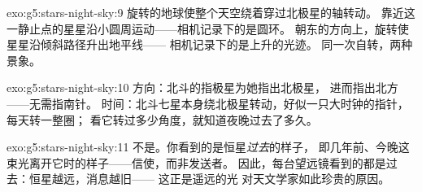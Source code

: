 \begin{solution}{exo:g5:stars-night-sky:9}
旋转的地球使整个天空绕着穿过北极星的轴转动。
靠近这一静止点的星星沿小圆周运动——相机记录下的是圆环。
朝东的方向上，旋转使星星沿倾斜路径升出地平线——
相机记录下的是上升的光迹。
同一次自转，两种景象。
\end{solution}

\begin{solution}{exo:g5:stars-night-sky:10}
方向：北斗的指极星为她指出北极星，
进而指出北方——无需指南针。
时间：北斗七星本身绕北极星转动，好似一只大时钟的指针，
每天转一整圈；
看它转过多少角度，就知道夜晚过去了多久。
\end{solution}

\begin{solution}{exo:g5:stars-night-sky:11}
不是。你看到的是恒星\emph{过去}的样子，
即几年前、今晚这束光离开它时的样子——信使，而非发送者。
因此，每台望远镜看到的都是过去：恒星越远，消息越旧——
这正是遥远的光
对天文学家如此珍贵的原因。
\end{solution}
